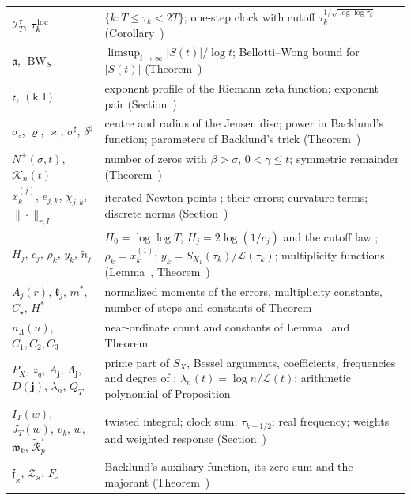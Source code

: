 \documentclass[preprint,12pt]{elsarticle}
\makeatletter
\let\CG@origref\ref
\let\CG@origeqref\eqref
\newcommand{\CG@gettip}[1]{\@ifundefined{CGTip@#1}{Reference: #1}{\csname CGTip@#1\endcsname}}
\DeclareRobustCommand{\CGref}[1]{\pdftooltip{\CG@origref{#1}}{\CG@gettip{#1}}}
\DeclareRobustCommand{\CGeqref}[1]{\pdftooltip{\CG@origeqref{#1}}{\CG@gettip{#1}}}
\numberwithin{equation}{section}
\theoremstyle{plain}
\theoremstyle{definition}
\theoremstyle{remark}
\newcommand{\lL}{\mathcal L}
\newcommand{\BWS}{\operatorname{BW}_S}
\makeatother
\begin{document}
\begin{center}
\begin{longtable}{p{}p{}}
$\mathcal I_T^\tau$, $\tau_k^{\rm loc}$ & $\{k:T\le\tau_k<2T\}$; one-step clock with cutoff $\tau_k^{1/\sqrt{\log\log\tau_k}}$ (Corollary~\CGref{cor:local_clock})\\
$\mathfrak a$, $\BWS$ & $\limsup_{t\to\infty}|S(t)|/\log t$; Bellotti--Wong bound for $|S(t)|$ (Theorem~\CGref{thm:known_BW})\\
$\mathfrak e$, $(\mathsf k,\mathsf l)$ & exponent profile of the Riemann zeta function; exponent pair (Section~\CGref{sec:envelope})\\
$\sigma_\circ$, $\varrho$, $\varkappa$, $\sigma^\sharp$, $\delta^\sharp$ & centre and radius of the Jensen disc; power in Backlund's function; parameters of Backlund's trick (Theorem~\CGref{thm:known_backlund})\\
$N^+(\sigma,t)$, $\mathcal K_n(t)$ & number of zeros with $\beta>\sigma$, $0<\gamma\le t$; symmetric remainder (Theorem~\CGref{thm:landau_line})\\
$x^{(j)}_k$, $e_{j,k}$, $\chi_{j,k}$, $\|\cdot\|_{r,I}$ & iterated Newton points \CGeqref{eq:newton_iteration}; their errors; curvature terms; discrete norms (Section~\CGref{sec:iteration})\\
$H_j$, $c_j$, $\rho_k$, $y_k$, $\tilde n_j$ & $H_0=\log\log T$, $H_j=2\log(1/c_j)$ and the cutoff law \CGeqref{eq:cutoff_law}; $\rho_k=x^{(1)}_k$; $y_k=S_{X_1}(\tau_k)/\lL(\tau_k)$; multiplicity functions (Lemma~\CGref{lem:multiplicity}, Theorem~\CGref{thm:multiplicity_all})\\
$A_j(r)$, $\mathfrak k_j$, $m^*$, $C_\star$, $H^*$ & normalized moments of the errors, multiplicity constants, number of steps and constants of Theorem~\CGref{thm:uniform_iteration}\\
$n_\Lambda(u)$, $C_1,C_2,C_3$ & near-ordinate count and constants of Lemma~\CGref{lem:zero_pairs} and Theorem~\CGref{thm:multiplicity_all}\\
$P_X$, $z_q$, $A_{\mathbf j}$, $\Lambda_{\mathbf j}$, $D(\mathbf j)$, $\lambda_n$, $Q_T$ & prime part of $S_X$, Bessel arguments, coefficients, frequencies and degree of \CGeqref{eq:bessel_expansion}; $\lambda_n(t)=\log n/\lL(t)$; arithmetic polynomial of Proposition~\CGref{prop:spectral_barrier}\\
$I_T(w)$, $J_T(w)$, $v_k$, $w$, $\mathfrak w_k$, $\widetilde{\mathcal R}^\tau_p$ & twisted integral; clock sum; $\tau_{k+1/2}$; real frequency; weights and weighted response (Section~\CGref{subsec:twist})\\
$\mathfrak f_\varkappa$, $\mathcal Z_\varkappa$, $F_\circ$ & Backlund's auxiliary function, its zero sum and the majorant (Theorem~\CGref{thm:known_backlund})\\
\end{longtable}
\end{center}
\end{document}
